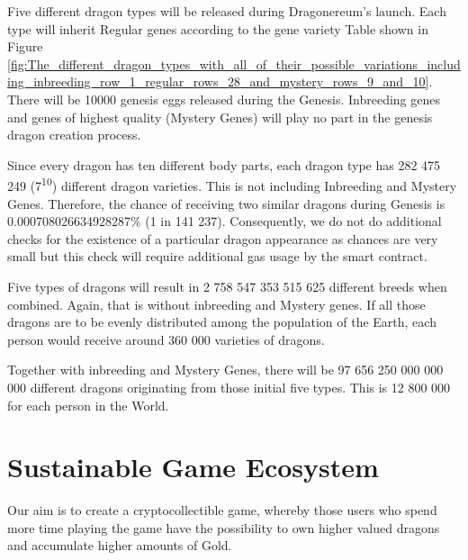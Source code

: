 \documentclass[12pt]{article}
\begin{document}
Five different dragon types will be released during Dragonereum’s launch. Each type will inherit Regular genes according to the gene variety Table shown in Figure  \ref{fig:The_different_dragon_types_with_all_of_their_possible_variations_including_inbreeding_row_1_regular_rows_28_and_mystery_rows_9_and_10}.  There will be 10000 genesis eggs released during the Genesis. Inbreeding genes and genes of highest quality (Mystery Genes) will play no part in the genesis dragon creation process.\par

Since every dragon has ten different body parts, each dragon type has 282 475 249 (7\textsuperscript{10}) different dragon varieties. This is not including Inbreeding and Mystery Genes. Therefore, the chance of receiving two similar dragons during Genesis is 0.000708026634928287$\%$  (1 in 141 237). Consequently, we do not do additional checks for the existence of a particular dragon appearance as chances are very small but this check will require additional gas usage by the smart contract.\par

Five types of dragons will result in 2 758 547 353 515 625 different breeds when combined. Again, that is without inbreeding and Mystery genes. If all those dragons are to be evenly distributed among the population of the Earth, each person would receive around 360 000 varieties of dragons.\par

Together with inbreeding and Mystery Genes, there will be 97 656 250 000 000 000 different dragons originating from those initial five types. This is 12 800 000 for each person in the World.


\newpage
\par

\section{Sustainable Game Ecosystem}
 \label{Sustainable Game Ecosystem}  \par

Our aim is to create a cryptocollectible game, whereby those users who spend more time playing the game have the possibility to own higher valued dragons and accumulate higher amounts of Gold.\par
\end{document}
